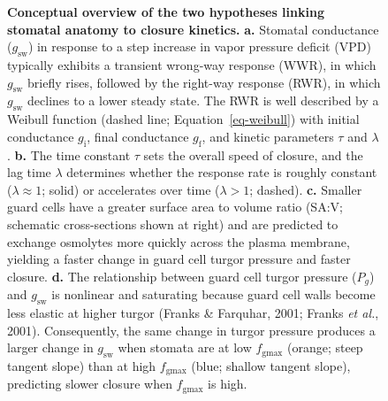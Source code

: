 \documentclass[
  letterpaper,
  DIV=11,
  numbers=noendperiod]{scrartcl}
\newcommand{\fgmax}{$f_\mathrm{gmax}$}
\newcommand{\gsw}{$g_\mathrm{sw}$}
\begin{document}
\begin{figure}


\caption{\label{fig-conceptual}\textbf{Conceptual overview of the two hypotheses linking stomatal anatomy to closure kinetics.}
\textbf{a.} Stomatal conductance (\gsw) in response to a step increase
in vapor pressure deficit (VPD) typically exhibits a transient wrong-way
response (WWR), in which \gsw{} briefly rises, followed by the right-way
response (RWR), in which \gsw{} declines to a lower steady state. The
RWR is well described by a Weibull function (dashed line;
Equation~\ref{eq-weibull}) with initial conductance \(g_\mathrm{i}\),
final conductance \(g_\mathrm{f}\), and kinetic parameters \(\tau\) and
\(\lambda\). \textbf{b.} The time constant \(\tau\) sets the overall
speed of closure, and the lag time \(\lambda\) determines whether the
response rate is roughly constant (\(\lambda \approx 1\); solid) or
accelerates over time (\(\lambda > 1\); dashed). \textbf{c.} Smaller
guard cells have a greater surface area to volume ratio (SA:V; schematic
cross-sections shown at right) and are predicted to exchange osmolytes
more quickly across the plasma membrane, yielding a faster change in
guard cell turgor pressure and faster closure. \textbf{d.} The
relationship between guard cell turgor pressure (\(P_g\)) and \gsw{} is
nonlinear and saturating because guard cell walls become less elastic at
higher turgor (Franks \& Farquhar, 2001; Franks \emph{et al.}, 2001).
Consequently, the same change in turgor pressure produces a larger
change in \gsw{} when stomata are at low \fgmax{} (orange; steep tangent
slope) than at high \fgmax{} (blue; shallow tangent slope), predicting
slower closure when \fgmax{} is high.}

\end{figure}%
\end{document}

